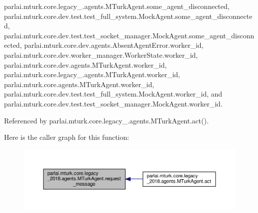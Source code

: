 parlai.\+mturk.\+core.\+legacy\+\_.\+agents.\+M\+Turk\+Agent.\+some\+\_\+agent\+\_\+disconnected, parlai.\+mturk.\+core.\+dev.\+test.\+test\+\_\+full\+\_\+system.\+Mock\+Agent.\+some\+\_\+agent\+\_\+disconnected, parlai.\+mturk.\+core.\+dev.\+test.\+test\+\_\+socket\+\_\+manager.\+Mock\+Agent.\+some\+\_\+agent\+\_\+disconnected, parlai.\+mturk.\+core.\+dev.\+agents.\+Absent\+Agent\+Error.\+worker\+\_\+id, parlai.\+mturk.\+core.\+dev.\+worker\+\_\+manager.\+Worker\+State.\+worker\+\_\+id, parlai.\+mturk.\+core.\+dev.\+agents.\+M\+Turk\+Agent.\+worker\+\_\+id, parlai.\+mturk.\+core.\+legacy\+\_.\+agents.\+M\+Turk\+Agent.\+worker\+\_\+id, parlai.\+mturk.\+core.\+agents.\+M\+Turk\+Agent.\+worker\+\_\+id, parlai.\+mturk.\+core.\+dev.\+test.\+test\+\_\+full\+\_\+system.\+Mock\+Agent.\+worker\+\_\+id, and parlai.\+mturk.\+core.\+dev.\+test.\+test\+\_\+socket\+\_\+manager.\+Mock\+Agent.\+worker\+\_\+id.



Referenced by parlai.\+mturk.\+core.\+legacy\+\_.\+agents.\+M\+Turk\+Agent.\+act().

Here is the caller graph for this function\+:
\nopagebreak
\begin{figure}[H]
\begin{center}
\leavevmode
\includegraphics[width=350pt]{classparlai_1_1mturk_1_1core_1_1legacy__2018_1_1agents_1_1MTurkAgent_a7c3620ae641e70de1b9d212910ec1158_icgraph}
\end{center}
\end{figure}
\mbox{\label{classparlai_1_1mturk_1_1core_1_1legacy__2018_1_1agents_1_1MTurkAgent_a748e50850e239f14236d4817e20fa799}} 
